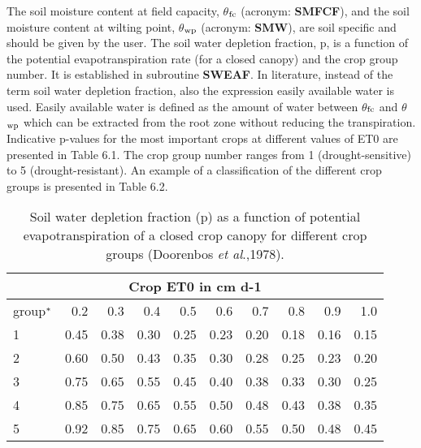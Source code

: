 The soil moisture content at field capacity, {\bf $\theta$$_{{\rm fc}}$} (acronym: {\bf SMFCF}), 
and the soil moisture content at wilting point, {\bf $\theta$$_{{\rm wp}}$} (acronym: {\bf SMW}), 
are soil specific and should be given by the user. The soil water depletion fraction, p, is 
a function of the potential evapotranspiration rate (for a closed canopy) and the crop group 
number. It is established in subroutine
{\bf SWEAF}. In literature, instead of the term soil water depletion fraction, also the 
expression easily available water is used. Easily available water is defined as the amount of
water between $\theta$$_{{\rm fc}}$ and $\theta$$_{{\rm wp}}$ which can be extracted from the root 
zone without reducing the
transpiration. Indicative p-values for the most important crops at different values of ET0
are presented in Table 6.1. The crop group number ranges from 1 (drought-sensitive) to 5
(drought-resistant). An example of a classification of the different crop groups is
presented in Table 6.2.

\begin{table}
\caption{Soil water depletion fraction (p) as a function of potential evapotranspiration 
of a closed crop canopy for different crop groups (Doorenbos {\it et al}.,1978).}
\label{tbl:soilwatdeplfraction}
\begin{tabularx}{\textwidth}{Xrrrrrrrrr}
\hline
\multicolumn{10}{c}{Crop ET0 in cm d-1}\\
\hline
group$^{\rm *}$ & 0.2 & 0.3 & 0.4 & 0.5 & 0.6 & 0.7 & 0.8 & 0.9 & 1.0\\
1 & 0.45 & 0.38 & 0.30 & 0.25 & 0.23 & 0.20 & 0.18 & 0.16 & 0.15\\
2 & 0.60 & 0.50 & 0.43 & 0.35 & 0.30 & 0.28 & 0.25 & 0.23 & 0.20\\
3 & 0.75 & 0.65 & 0.55 & 0.45 & 0.40 & 0.38 & 0.33 & 0.30 & 0.25\\
4 & 0.85 & 0.75 & 0.65 & 0.55 & 0.50 & 0.48 & 0.43 & 0.38 & 0.35\\
5 & 0.92 & 0.85 & 0.75 & 0.65 & 0.60 & 0.55 & 0.50 & 0.48 & 0.45\\
\hline 
\end{tabularx} 
\end{table}


